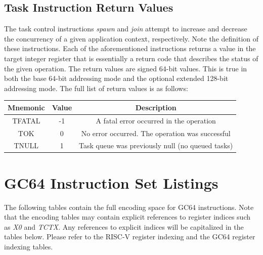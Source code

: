 \documentclass{article}
\begin{document}
\subsection{Task Instruction Return Values}

The task control instructions \emph{spawn} and \emph{join}
attempt to increase and decrease the concurrency of a given
application context, respectively.  Note the definition of these
instructions.  Each of the aforementioned instructions returns a value
in the target integer register that is essentially a return code that
describes the status of the given operation.  The return values are signed
64-bit values.  This is true in both the base 64-bit addressing mode 
and the optional extended 128-bit addressing mode.  The full list of 
return values is as follows: 

\begin{center}
\begin{tabular}{| c | c | c |}
\hline
Mnemonic & Value & Description \\ 
\hline \hline
TFATAL & -1 & A fatal error occurred in the operation\\
\hline
TOK & 0 & No error occurred.  The operation was successful\\
\hline 
TNULL & 1 & Task queue was previously null (no queued tasks)\\
\hline
\end{tabular}
\end{center} 


\newpage
\section{GC64 Instruction Set Listings}

The following tables contain the full encoding space for GC64 instructions. 
Note that the encoding tables may contain explicit references to register
indices such as \emph{X0} and \emph{TCTX}.  Any references to explicit indices
will be capitalized in the tables below.  Please refer to the RISC-V register
indexing and the GC64 register indexing tables.
\end{document}
